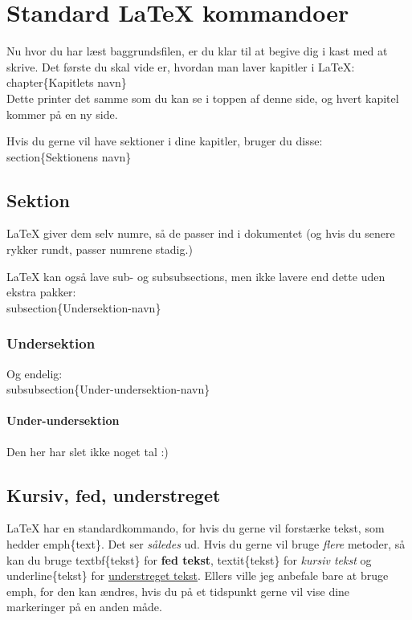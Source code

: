 \chapter{Standard LaTeX kommandoer}
Nu hvor du har læst baggrundsfilen, er du klar til at begive dig i kast med at skrive. Det første du skal vide er, hvordan man laver kapitler i LaTeX:\\ 

\bs chapter\{Kapitlets navn\}\\

\noindent %
Dette printer det samme som du kan se i toppen af denne side, og hvert kapitel kommer på en ny side.

\noindent
Hvis du gerne vil have sektioner i dine kapitler, bruger du disse:\\

\bs section\{Sektionens navn\}

\section{Sektion}
LaTeX giver dem selv numre, så de passer ind i dokumentet (og hvis du senere rykker rundt, passer numrene stadig.)

\noindent
LaTeX kan også lave sub- og subsubsections, men ikke lavere end dette uden ekstra pakker:\\

\bs subsection\{Undersektion-navn\}

\subsection{Undersektion}
Og endelig:\\

\bs subsubsection\{Under-undersektion-navn\}

\subsubsection{Under-undersektion}
Den her har slet ikke noget tal :)

\section{Kursiv, fed, understreget}
LaTeX har en standardkommando, for hvis du gerne vil forstærke tekst, som hedder \bs emph\{text\}. Det ser \emph{således} ud. Hvis du gerne vil bruge \emph{flere} metoder, så kan du bruge \bs textbf\{tekst\} for \textbf{fed tekst}, \bs textit\{tekst\} for \textit{kursiv tekst} og \bs underline\{tekst\} for \underline{understreget tekst}. Ellers ville jeg anbefale bare at bruge \bs emph, for den kan ændres, hvis du på et tidspunkt gerne vil vise dine markeringer på en anden måde.

